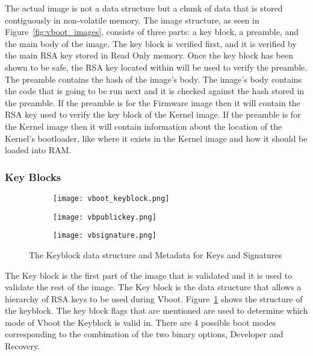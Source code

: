\documentclass[../report.tex]{subfiles}
\begin{document}
The actual image is not a data structure but a chunk of data that is stored contiguously in non-volatile memory.
The image structure, as seen in Figure~\ref{fig:vboot_images}, consists of three parts: a key block, a preamble, and the main body of the image.
The key block is verified first, and it is verified by the main RSA key stored in Read Only memory.
Once the key block has been shown to be safe, the RSA key located within will be used to verify the preamble.
The preamble contains the hash of the image's body.
The image's body contains the code that is going to be run next and it is checked against the hash stored in the preamble.
If the preamble is for the Firmware image then it will contain the RSA key used to verify the key block of the Kernel image.
If the preamble is for the Kernel image then it will contain information about the location of the Kernel's bootloader, like where it exists in the Kernel image and how it should be loaded into RAM\@.

\subsubsection{Key Blocks}

\begin{figure}
\begin{subfigure}{.5\textwidth}
  \centering
  \texttt{[image: vboot\_keyblock.png]}
\end{subfigure}
\begin{subfigure}{.20\textwidth}
  \centering
  \texttt{[image: vbpublickey.png]}
\end{subfigure}
\begin{subfigure}{.20\textwidth}
  \centering
  \texttt{[image: vbsignature.png]}
\end{subfigure}
\caption{The Keyblock data structure and Metadata for Keys and Signatures}
\label{fig:vboot_keyblock}
\end{figure}

The Key block is the first part of the image that is validated and it is used to validate the rest of the image.
The Key block is the data structure that allows a hierarchy of RSA keys to be used during Vboot.
Figure~\ref{fig:vboot_keyblock} shows the structure of the keyblock. 
The key block flags that are mentioned are used to determine which mode of Vboot the Keyblock is valid in. 
There are 4 possible boot modes corresponding to the combination of the two binary options, Developer and Recovery.
\end{document}
